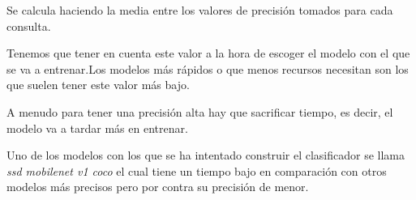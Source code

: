 Se calcula haciendo la media entre los valores de precisión tomados para cada consulta.

Tenemos que tener en cuenta este valor a la hora de escoger el modelo con el que se va a entrenar.Los modelos más rápidos o que menos recursos necesitan son los que suelen tener este valor más bajo.

A menudo para tener una precisión alta hay que sacrificar tiempo, es decir, el modelo va a tardar más en entrenar.

Uno de los modelos con los que se ha intentado construir el clasificador se llama \textit{ssd mobilenet v1 coco} el cual tiene un tiempo bajo en comparación con otros modelos más precisos pero por contra su precisión de menor.



